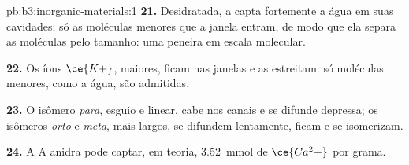 \begin{solution}{pb:b3:inorganic-materials:1}
\textbf{21.} Desidratada, a  capta fortemente a água em suas cavidades; só
as moléculas menores que a janela entram, de modo que ela separa as moléculas pelo tamanho:
uma peneira em escala molecular.

\textbf{22.} Os íons $\ce{K+}$, maiores, ficam nas janelas e as estreitam: só moléculas
menores, como a água, são admitidas.

\textbf{23.} O isômero \textit{para}, esguio e linear, cabe nos canais e se difunde depressa; os
isômeros \textit{orto} e \textit{meta}, mais largos, se difundem lentamente, ficam e se isomerizam.

\textbf{24.} A  A anidra pode captar, em teoria, \qty{3.52}{mmol} de $\ce{Ca^2+}$ por grama.
\end{solution}
